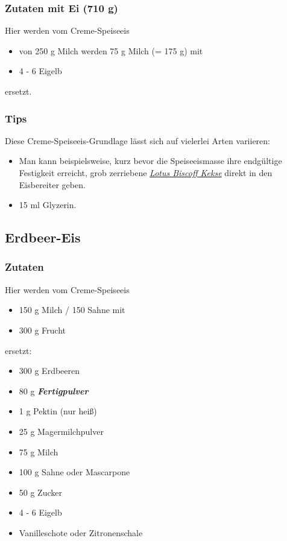 \documentclass[12pt]{article}
\begin{document}
\subsubsection {Zutaten mit Ei (710 g)}

Hier werden vom Creme-Speiseeis 
\begin{itemize}
  \item von 250 g Milch werden 75 g Milch (= 175 g) mit
  \item 4 - 6 Eigelb
\end{itemize}
ersetzt.


\subsubsection {Tips}
	Diese Creme-Speiseeis-Grundlage lässt sich auf vielerlei Arten variieren: 
	\begin{itemize}
  		\item Man kann beispielsweise, kurz bevor die Speiseeismasse ihre endgültige Festigkeit erreicht, grob zerriebene  \href{https://www.lotusbiscoff.com/de-de}{\textit{Lotus Biscoff Kekse}} direkt in den Eisbereiter geben.
  		\item 15 ml Glyzerin.
	\end{itemize}


\pagebreak

\subsection{Erdbeer-Eis}
\subsubsection {Zutaten}
	Hier werden vom Creme-Speiseeis 
	\begin{itemize}
	  \item 150 g Milch / 150 Sahne mit
	  \item 300 g Frucht
	\end{itemize}
	ersetzt:

\begin{itemize}
 	\item 300 g Erdbeeren
\end{itemize}
\begin{itemize}
	\item 80 g \textbf{\textit{Fertigpulver}}
  	\item 1 g Pektin (nur heiß)
  	\item 25 g Magermilchpulver
\end{itemize}
\begin{itemize}
  	\item 75 g Milch 
  	\item 100 g Sahne oder Mascarpone
  	\item 50 g Zucker
  	\item 4 - 6 Eigelb
  	\item Vanilleschote oder Zitronenschale
\end{itemize}
\end{document}
